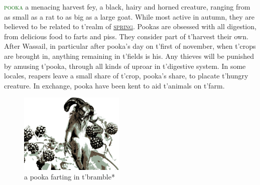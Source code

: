 \documentclass[twoside,11pt,b5paper,twocolumn]{scrbook}
\newcommand{\estcab}[1]{\textsc{\textcolor{marron}{#1}}}
\newcommand{\keyword}[1]{\textcolor{darkgreen}{#1}}
\renewcommand{\paragraph}[1]{\par\noindent\markboth{#1}{#1}\estcab{\keyword{#1}}\label{#1} }
\newcommand{\see}[1]{{\estcab{\hyperref[#1]{#1}}}}
\begin{document}
\paragraph{pooka} a menacing harvest fey, a black, hairy and horned creature, ranging from as small as a rat to as big as a large goat. While most active in autumn, they are believed to be related to t'realm of \see{spring}. Pookas are obsessed with all digestion, from delicious food to farts and piss. They consider part of t'harvest their own. After Wassail, in particular after pooka's day on t'first of november, when t'crops are brought in, anything remaining in t'fields is his. Any thieves will be punished by amusing t'pooka, through all kinds of uproar in t'digestive system. In some locales, reapers leave a small share of t'crop, pooka's share, to placate t'hungry creature. In exchange, pooka have been kent to aid t'animals on t'farm. \begin{figure}\centering\includegraphics[width=5cm]{encyclopedia/pooka}\caption{a pooka farting in t'bramble*}\end{figure}
\end{document}
